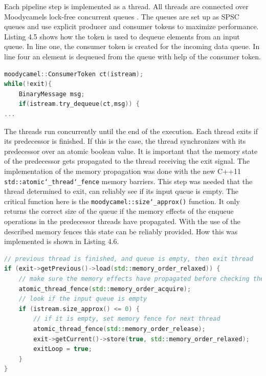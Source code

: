 \pagebreak
Each pipeline step is implemented as a thread. All threads are connected over Moodycamels lock-free concurrent queues \cite{moody}. The queues are set up as SPSC queues and use explicit producer and consumer tokens to maximize performance. Listing 4.5 shows how the token is used to dequeue elements from an input queue. In line one, the consumer token is created for the incoming data queue. In line four an element is dequeued from the queue with help of the consumer token.
\vspace{1em}
\begin{lstlisting}[language=C++, caption=Code snippet showing the use of consumer tokens.]
moodycamel::ConsumerToken ct(istream);
while(!exit){
    BinaryMessage msg;
    if(istream.try_dequeue(ct,msg)) {
...
\end{lstlisting}

The threads run concurrently until the end of the execution. Each thread exits if its predecessor is finished. If this is the case, the thread synchronizes with its predecessor over an atomic boolean value. It is important that the memory state of the predecessor gets propagated to the thread receiving the exit signal. The implementation of the memory propagation was done with the new C++11 \texttt{std::atomic\char`_thread\char`_fence} memory barriers. This step was needed that the thread determined to exit, can reliably see if its input queue is empty. The critical function here is the \texttt{moodycamel::size\char`_approx()} function. It only returns the correct size of the queue if the memory effects of the enqueue operations in the predecessor threads have propagated. With the use of the described memory fences this state can be reliably provided. How this was implemented is shown in Listing 4.6.
\vspace{1em}
\begin{lstlisting}[language=C++, caption=Code snippet highlighting the memory barriers.]
// previous thread is finished, and queue is empty, then exit thread
if (exit->getPrevious()->load(std::memory_order_relaxed)) {
    // make sure the memory effects have propagated before checking the size
    atomic_thread_fence(std::memory_order_acquire);
    // look if the input queue is empty
    if (istream.size_approx() <= 0) {
        // if it is empty, set memory fence for next thread
        atomic_thread_fence(std::memory_order_release);
        exit->getCurrent()->store(true, std::memory_order_relaxed);
        exitLoop = true;
    }
}
\end{lstlisting}

